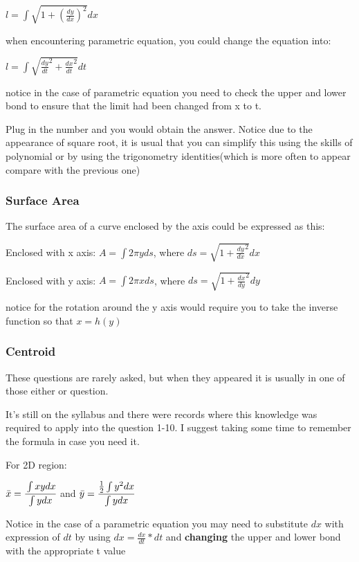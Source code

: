 \documentclass[]{article}
\begin{document}
\(l = \int{\sqrt{1 + (\frac{dy}{dx})^2} dx}\)

when encountering parametric equation, you could change the equation
into:

\(l = \int{\sqrt{{\frac{dy}{dt}}^2 + {\frac{dx}{dt}}^2}}dt\)

notice in the case of parametric equation you need to check the upper
and lower bond to ensure that the limit had been changed from x to t.

Plug in the number and you would obtain the answer. Notice due to the
appearance of square root, it is usual that you can simplify this using
the skills of polynomial or by using the trigonometry identities(which
is more often to appear compare with the previous one)

\subsubsection{Surface Area}\label{header-n1076}

The surface area of a curve enclosed by the axis could be expressed as
this:

Enclosed with x axis: \(A = \int 2\pi y ds\), where
\(ds = \sqrt{1+{\frac{dy}{dx}}^2}dx\)

Enclosed with y axis: \(A = \int 2\pi x ds\), where
\(ds = \sqrt{1+{\frac{dx}{dy}}^2}dy\)

notice for the rotation around the y axis would require you to take the
inverse function so that \(x = h(y)\)

\subsubsection{Centroid}\label{header-n1085}

These questions are rarely asked, but when they appeared it is usually
in one of those either or question.

It's still on the syllabus and there were records where this knowledge
was required to apply into the question 1-10. I suggest taking some time
to remember the formula in case you need it.

For 2D region:

\(\bar{x} = \cfrac{\int{xy}dx}{\int{y}dx}\) and
\(\bar{y} = \cfrac{\frac{1}{2}\int{y^2}dx}{\int{y}dx}\)

Notice in the case of a parametric equation you may need to substitute
\(dx\) with expression of \(dt\) by using \(dx = \frac{dx}{dt} * dt\)
and \textbf{changing} the upper and lower bond with the appropriate t
value
\end{document}
